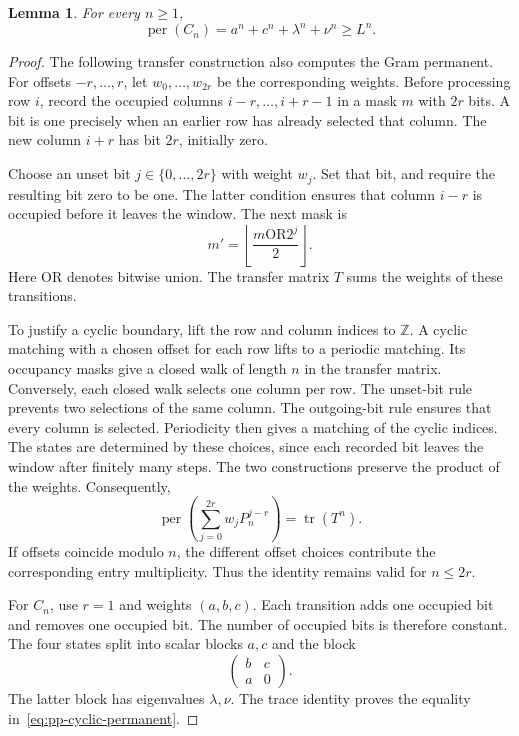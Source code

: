 \documentclass[11pt,a4paper]{article}
\newtheorem{lemma}[theorem]{Lemma}
\theoremstyle{definition}
\theoremstyle{remark}
\newcommand{\per}{\operatorname{per}}
\begin{document}
\begin{lemma}\label{lem:pp-cyclic-permanent}
For every $n\ge1$,
\begin{equation}\label{eq:pp-cyclic-permanent}
\per(C_n)=a^n+c^n+\lambda^n+\nu^n\ge L^n.
\end{equation}
\end{lemma}

\begin{proof}
The following transfer construction also computes the Gram permanent.
For offsets $-r,\ldots,r$, let $w_0,\ldots,w_{2r}$ be the corresponding weights.
Before processing row $i$, record the occupied columns
$i-r,\ldots,i+r-1$ in a mask $m$ with $2r$ bits.
A bit is one precisely when an earlier row has already selected that column.
The new column $i+r$ has bit $2r$, initially zero.

Choose an unset bit $j\in\{0,\ldots,2r\}$ with weight $w_j$.
Set that bit, and require the resulting bit zero to be one.
The latter condition ensures that column $i-r$ is occupied before it leaves the window.
The next mask is
\begin{equation}\label{eq:pp-mask-transition}
m'=\left\lfloor\frac{m\mathbin{\mathrm{OR}}2^j}{2}\right\rfloor.
\end{equation}
Here $\mathrm{OR}$ denotes bitwise union.
The transfer matrix $T$ sums the weights of these transitions.

To justify a cyclic boundary, lift the row and column indices to $\mathbb Z$.
A cyclic matching with a chosen offset for each row lifts to a periodic matching.
Its occupancy masks give a closed walk of length $n$ in the transfer matrix.
Conversely, each closed walk selects one column per row.
The unset-bit rule prevents two selections of the same column.
The outgoing-bit rule ensures that every column is selected.
Periodicity then gives a matching of the cyclic indices.
The states are determined by these choices, since each recorded bit leaves the window after finitely many steps.
The two constructions preserve the product of the weights.
Consequently,
\begin{equation}\label{eq:pp-general-trace}
\per\left(\sum_{j=0}^{2r}w_jP_n^{j-r}\right)
=\operatorname{tr}(T^n).
\end{equation}
If offsets coincide modulo $n$, the different offset choices contribute the corresponding entry multiplicity.
Thus the identity remains valid for $n\le2r$.

For $C_n$, use $r=1$ and weights $(a,b,c)$.
Each transition adds one occupied bit and removes one occupied bit.
The number of occupied bits is therefore constant.
The four states split into scalar blocks $a,c$ and the block
\[
\begin{pmatrix}b&c\\a&0\end{pmatrix}.
\]
The latter block has eigenvalues $\lambda,\nu$.
The trace identity proves the equality in~\eqref{eq:pp-cyclic-permanent}.


\end{proof}
\end{document}
